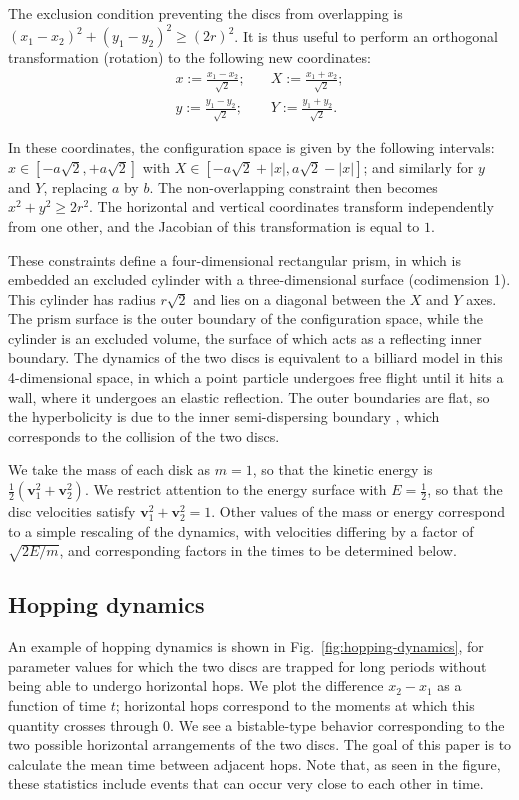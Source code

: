 \documentclass[superscriptaddress,pre,reprint,showpacs,twocolumn]{revtex4-1}
\newcommand{\defeq}{:=}
\begin{document}
The exclusion condition preventing the discs from overlapping is $(x_1-x_2)^2 + (y_1-y_2)^2 \ge (2r)^2$.
It is thus useful to perform an orthogonal transformation (rotation) to the following new coordinates:
\begin{equation}\label{cambiocoor01}
  \begin{split}
 x  \defeq \frac{x_1 - x_2}{\sqrt{2}};  &
\quad X  \defeq \frac{x_1 + x_2}{\sqrt{2}};  \\
 y  \defeq \frac{y_1 - y_2}{\sqrt{2}}; & 
\quad Y  \defeq \frac{y_1 + y_2}{\sqrt{2}}.
\end{split}
\end{equation}


In these coordinates, the configuration space is given by the following
intervals:
$x \in [-a \sqrt{2}, +a \sqrt{2}]$ with 
$X \in [-a \sqrt{2} + |x|, a \sqrt{2} - |x|]$; and similarly for $y$ and $Y$, replacing $a$ by $b$.
The non-overlapping constraint then becomes $x^2 + y^2 \ge 2 r^2$.
The horizontal and vertical coordinates transform independently
from one other, and the Jacobian of this transformation is  equal to $1$.

These constraints define a four-dimensional
rectangular prism, in which is embedded an excluded cylinder with a three-dimensional surface
(codimension 1).
This cylinder has radius $r\sqrt{2}$ and lies
on a diagonal between the $X$ and $Y$ axes.
The prism surface is the outer boundary of the configuration space,
while the cylinder is an excluded volume, the surface of which
acts as a reflecting inner boundary.
The dynamics of the two discs is equivalent to a billiard model in this 4-dimensional space, in which 
a point particle undergoes free flight until
it hits a wall, where it undergoes an elastic reflection.
The outer boundaries are flat, so the
hyperbolicity is due to the inner semi-dispersing
boundary \cite{Sim99}, which corresponds to the collision of
the two discs.


We take the mass of each disk as $m=1$, so that the kinetic energy
is $\frac{1}{2}(\mathbf{v}_1^2 + \mathbf{v}_2^2)$. We restrict attention to the energy surface with
$E = \frac{1}{2}$, so that the disc velocities satisfy $\mathbf{v}_1^2 + \mathbf{v}_2^2 = 1$.
Other values of the mass or energy correspond to a simple rescaling of the dynamics, with velocities differing
by a factor of
$\sqrt{2E/m}$, and corresponding factors in the times to be determined below.

\subsection{Hopping dynamics}
An example of hopping dynamics is shown in Fig.~\ref{fig:hopping-dynamics}, for parameter values for which the two discs are trapped for long periods without
being able to undergo horizontal hops. We plot the difference $x_2 - x_1$ as a function of time $t$; horizontal hops correspond to the moments at 
which this quantity crosses through $0$.  We see a bistable-type behavior corresponding to the two possible horizontal arrangements of the two discs. 
The goal of this paper is to calculate the mean time between adjacent hops. Note that, as seen in the figure, these statistics include events that can occur very close to each other in time.
\end{document}
